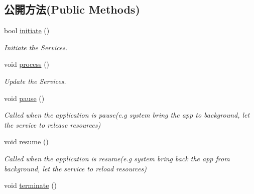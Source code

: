 \subsection*{公開方法(Public Methods)}
\begin{DoxyCompactItemize}
\item 
bool \hyperlink{class_i_dream_sky_1_1_video_1_1_manager_a561ebec411cdf6b41b91cfbb8d6422f4}{initiate} ()
\begin{DoxyCompactList}\small\item\em Initiate the Services. \end{DoxyCompactList}\item 
void \hyperlink{class_i_dream_sky_1_1_video_1_1_manager_afda0bea6def1b2387b3c48b8a472d5b7}{process} ()\hypertarget{class_i_dream_sky_1_1_video_1_1_manager_afda0bea6def1b2387b3c48b8a472d5b7}{}\label{class_i_dream_sky_1_1_video_1_1_manager_afda0bea6def1b2387b3c48b8a472d5b7}

\begin{DoxyCompactList}\small\item\em Update the Services. \end{DoxyCompactList}\item 
void \hyperlink{class_i_dream_sky_1_1_video_1_1_manager_af62ea72008ab069ba7348bb9dbe2ee8d}{pause} ()\hypertarget{class_i_dream_sky_1_1_video_1_1_manager_af62ea72008ab069ba7348bb9dbe2ee8d}{}\label{class_i_dream_sky_1_1_video_1_1_manager_af62ea72008ab069ba7348bb9dbe2ee8d}

\begin{DoxyCompactList}\small\item\em Called when the application is pause(e.\+g system bring the app to background, let the service to release resources) \end{DoxyCompactList}\item 
void \hyperlink{class_i_dream_sky_1_1_video_1_1_manager_a318faa055cdb1d1da6370ccdaa33480d}{resume} ()\hypertarget{class_i_dream_sky_1_1_video_1_1_manager_a318faa055cdb1d1da6370ccdaa33480d}{}\label{class_i_dream_sky_1_1_video_1_1_manager_a318faa055cdb1d1da6370ccdaa33480d}

\begin{DoxyCompactList}\small\item\em Called when the application is resume(e.\+g system bring back the app from background, let the service to reload resources) \end{DoxyCompactList}\item 
void \hyperlink{class_i_dream_sky_1_1_video_1_1_manager_a3a9b48bc7cad0f133f0bd874a12752da}{terminate} ()\hypertarget{class_i_dream_sky_1_1_video_1_1_manager_a3a9b48bc7cad0f133f0bd874a12752da}{}\label{class_i_dream_sky_1_1_video_1_1_manager_a3a9b48bc7cad0f133f0bd874a12752da}


\end{DoxyCompactItemize}
